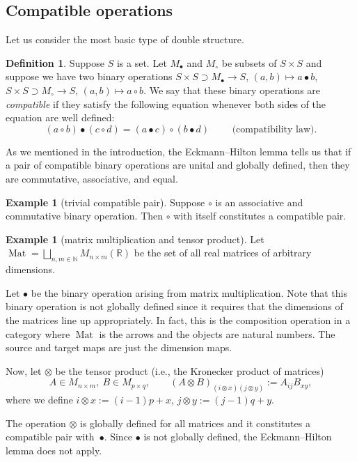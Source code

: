 \documentclass[pdftex]{sigma}
\numberwithin{equation}{section}
\theoremstyle{definition}
\newtheorem{Definition}[Theorem]{Definition}
\newtheorem{Example}[Theorem]{Example}
\newcommand{\BBR}{\mathbb{R}}
\newcommand{\BBN}{\mathbb{N}}
\DeclareMathOperator{\Mat}{Mat}
\begin{document}
\subsection{Compatible operations}
Let us consider the most basic type of double structure.
\begin{Definition}
  Suppose $ S $ is a set. Let $ M_\bullet $ and $ M_\circ $ be subsets of $ S \times S $ and suppose we have two binary operations
$S \times S \supset M_{\bullet} \to S$, $(a,b) \mapsto a \bullet b$, $S \times S \supset M_{\circ} \to S$, $(a,b) \mapsto a \circ b$. We say that these binary operations are \emph{compatible} if they satisfy the following equation whenever both sides of the equation are well defined:
  \begin{equation*}\label{eqn:The.Intertwining.Law}
  ( a \circ b) \bullet ( c \circ d) = (a \bullet c) \circ (b \bullet d) \qquad \text{ (compatibility law)}.
\end{equation*}
\end{Definition}
As we mentioned in the introduction, the Eckmann--Hilton lemma tells us that if a pair of compatible binary operations are unital and globally defined, then they are commutative, associative, and equal.

\begin{Example}[trivial compatible pair]
  Suppose $ \circ $ is an associative and commutative binary operation. Then $ \circ $ with itself constitutes a compatible pair.
\end{Example}
\begin{Example}[matrix multiplication and tensor product]\label{example:mat.mult.tensor}
  Let
$ \Mat = \bigsqcup_{n,m \in \BBN } M_{n \times m}(\BBR)$
  be the set of all real matrices of arbitrary dimensions.

   Let $ \bullet $ be the binary operation arising from matrix multiplication. Note that this binary operation is not globally defined since it requires that the dimensions of the matrices line up appropriately. In fact, this is the composition operation in a category where $ \Mat $ is the arrows and the objects are natural numbers. The source and target maps are just the dimension maps.

  Now, let $ \otimes $ be the tensor product (i.e., the Kronecker product of matrices)
  \[
  A \in M_{n\times m}, \  B \in M_{p \times q}, \qquad (A \otimes B )_{(i \otimes x)( j \otimes y)} := A_{ij} B_{xy},
  \]
  where we define
  $i \otimes x := (i-1)p + x$, $ j \otimes y := (j-1)q + y$.

   The operation $ \otimes $ is globally defined for all matrices and it constitutes a compatible pair with~$ \bullet $. Since $ \bullet$ is not globally defined, the Eckmann--Hilton lemma does not apply.
\end{Example}
\end{document}
